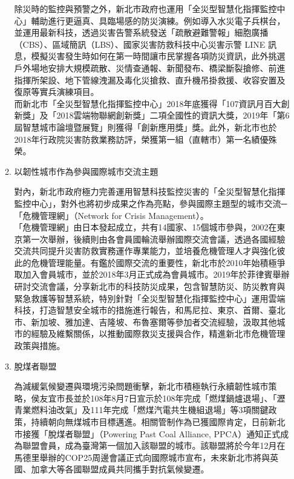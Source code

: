 \documentclass[a4paper,12pt]{article}
\begin{document}
\begin{enumerate}
\begin{enumerate}
除災時的監控與預警之外，新北市政府也運用「全災型智慧化指揮監控中心」輔助進行更逼真、具臨場感的防災演練。例如導入水災電子兵棋台，並運用最新科技，透過災害告警系統發送「疏散避難警報」細胞廣播（CBS）、區域簡訊（LBS）、國家災害防救科技中心災害示警 LINE 訊息，模擬災害發生時如何在第一時間讓市民掌握各項防災資訊，此外挑選戶外場地安排大規模疏散、災情查通報、新聞發布、橋梁斷裂搶修、前進指揮所架設、地下管線洩漏及毒化災搶救、直升機吊掛救援、收容安置及復原等實兵演練項目。\\

而新北市「全災型智慧化指揮監控中心」2018年底獲得「107資訊月百大創新獎」及「2018雲端物聯網創新獎」二項全國性的資訊大獎，2019年「第6屆智慧城市論壇暨展覽」則獲得「創新應用獎」獎。此外，新北市也於2018年行政院災害防救業務訪評，榮獲第一組（直轄市）第一名績優殊榮。\\
\item 以韌性城市作為參與國際城市交流主題
\label{sec:org3203d5d}

對內，新北市政府極力完善運用智慧科技監控災害的「全災型智慧化指揮監控中心」，對外也將初步成果之作為亮點，參與國際主題型的城市交流─「危機管理網」（Network for Crisis Management）。\\

「危機管理網」由日本發起成立，共有14國家、15個城市參與，2002在東京第一次舉辦，後續則由各會員國輪流舉辦國際交流會議，透過各國經驗交流共同提升災害防救實務運作專業能力，並培養危機管理人才與強化彼此的危機管理能量。有鑑於國際交流的重要性，新北市於2010年始積極爭取加入會員城市，並於2018年3月正式成為會員城市。2019年於菲律賓舉辦研討交流會議，分享新北市的科技防災成果，包含智慧防災、防災教育與緊急救護等智慧系統，特別針對「全災型智慧化指揮監控中心」運用雲端科技，打造智慧安全城市的措施進行報告，和馬尼拉、東京、首爾、臺北市、新加坡、雅加達、吉隆坡、布魯塞爾等參加者交流經驗，汲取其他城市的經驗及維繫關係，以推動國際救災支援與合作，精進新北市危機管理政策與措施。\\
\item 脫煤者聯盟
\label{sec:org4759f8c}

為減緩氣候變遷與環境污染問題衝擊，新北市積極執行永續韌性城市策略，侯友宜市長並於108年8月7日宣示於108年完成「燃煤鍋爐退場」、「瀝青業燃料油改氣」及111年完成「燃煤汽電共生機組退場」等3項關鍵政策，持續朝向無煤城市目標邁進。相關管制作為已獲國際肯定，日前新北市接獲「脫煤者聯盟」（Powering Past Coal Alliance, PPCA）通知正式成為聯盟會員，成為臺灣第一個加入該聯盟的城市。該聯盟將於今年12月在馬德里舉辦的COP25周邊會議正式向國際城市宣布，未來新北市將與英國、加拿大等各國聯盟成員共同攜手對抗氣候變遷。\\


\end{enumerate}
\end{enumerate}
\end{document}
